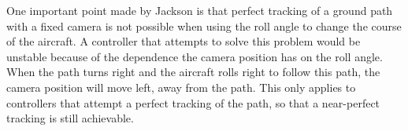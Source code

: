 One important point made by Jackson is that perfect tracking of a ground path with a fixed camera is not possible when using the roll angle to change the course of the aircraft. A controller that attempts to solve this problem would be unstable because of the dependence the camera position has on the roll angle. When the path turns right and the aircraft rolls right to follow this path, the camera position will move left, away from the path. This only applies to controllers that attempt a perfect tracking of the path, so that a near-perfect tracking is still achievable.